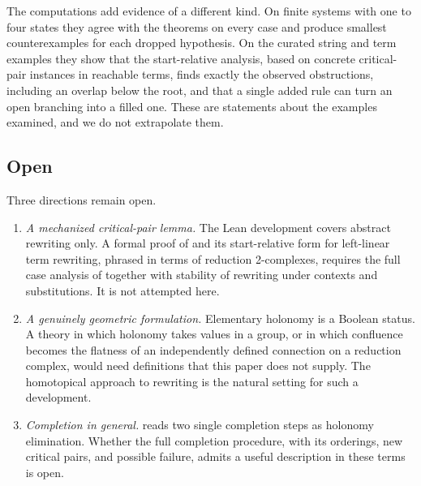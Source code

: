 The computations add evidence of a different kind. On finite systems with one to four states they agree with the theorems on every case and produce smallest counterexamples for each dropped hypothesis. On the curated string and term examples they show that the start-relative analysis, based on concrete critical-pair instances in reachable terms, finds exactly the observed obstructions, including an overlap below the root, and that a single added rule can turn an open branching into a filled one. These are statements about the examples examined, and we do not extrapolate them.

\subsection{Open}
\label{subsec:what-remains}

Three directions remain open.

\begin{enumerate}
    \item \emph{A mechanized critical-pair lemma.} The Lean development covers abstract rewriting only. A formal proof of  and its start-relative form for left-linear term rewriting, phrased in terms of reduction 2-complexes, requires the full case analysis of  together with stability of rewriting under contexts and substitutions. It is not attempted here.
    \item \emph{A genuinely geometric formulation.} Elementary holonomy is a Boolean status. A theory in which holonomy takes values in a group, or in which confluence becomes the flatness of an independently defined connection on a reduction complex, would need definitions that this paper does not supply. The homotopical approach to rewriting \cite{Squier1987,GuiraudMalbos2012,GuiraudMalbos2018,Mimram2023} is the natural setting for such a development.
    \item \emph{Completion in general.}  reads two single completion steps as holonomy elimination. Whether the full completion procedure, with its orderings, new critical pairs, and possible failure, admits a useful description in these terms is open.
\end{enumerate}
